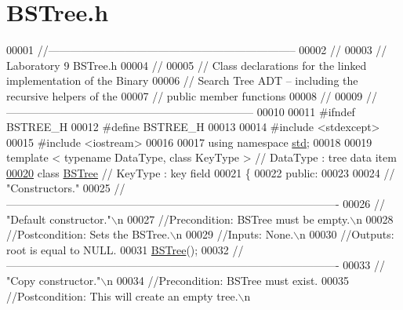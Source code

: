 \hypertarget{_b_s_tree_8h_source}{}\section{B\+S\+Tree.\+h}

\begin{DoxyCode}
00001 \textcolor{comment}{//--------------------------------------------------------------------}
00002 \textcolor{comment}{//}
00003 \textcolor{comment}{//  Laboratory 9                                    BSTree.h}
00004 \textcolor{comment}{//}
00005 \textcolor{comment}{//  Class declarations for the linked implementation of the Binary}
00006 \textcolor{comment}{//  Search Tree ADT -- including the recursive helpers of the}
00007 \textcolor{comment}{//  public member functions}
00008 \textcolor{comment}{//}
00009 \textcolor{comment}{//--------------------------------------------------------------------}
00010 
00011 \textcolor{preprocessor}{#ifndef BSTREE\_H}
00012 \textcolor{preprocessor}{#define BSTREE\_H}
00013 
00014 \textcolor{preprocessor}{#include <stdexcept>}
00015 \textcolor{preprocessor}{#include <iostream>}
00016 
00017 \textcolor{keyword}{using namespace }\hyperlink{namespacestd}{std};
00018 
00019 \textcolor{keyword}{template} < \textcolor{keyword}{typename} DataType, \textcolor{keyword}{class} KeyType >    \textcolor{comment}{// DataType : tree data item}
\hypertarget{_b_s_tree_8h_source_l00020}{}\hyperlink{class_b_s_tree}{00020} \textcolor{keyword}{class }\hyperlink{class_b_s_tree}{BSTree}                                     \textcolor{comment}{// KeyType : key field}
00021 \{
00022 \textcolor{keyword}{public}:
00023 
00024     \textcolor{comment}{// "Constructors."}
00025    \textcolor{comment}{//-------------------------------------------------------------------------------------------}
00026     \textcolor{comment}{// "Default constructor."\(\backslash\)n}
00027     \textcolor{comment}{//Precondition: BSTree must be empty.\(\backslash\)n}
00028     \textcolor{comment}{//Postcondition: Sets the BSTree.\(\backslash\)n}
00029     \textcolor{comment}{//Inputs: None.\(\backslash\)n}
00030     \textcolor{comment}{//Outputs: root is equal to NULL.}
00031     \hyperlink{class_b_s_tree}{BSTree}();
00032     \textcolor{comment}{//-------------------------------------------------------------------------------------------}
00033     \textcolor{comment}{// "Copy constructor."\(\backslash\)n}
00034     \textcolor{comment}{//Precondition: BSTree must exist.}
00035     \textcolor{comment}{//Postcondition: This will create an empty tree.\(\backslash\)n}

\end{DoxyCode}
